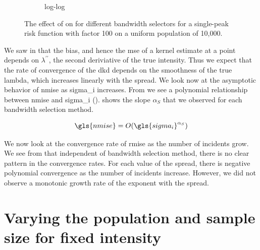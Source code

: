 \begin{figure}[htbp]
\begin{subfigure}[t]{0.49\textwidth}
        \caption{ log-log}
        \label{fig:ise:unif_Spreads_1h:nmise_log_log}
    \end{subfigure}
    \caption[: by risk ]
        {The effect of  on  for different bandwidth selectors for a single-peak risk function with \gls{factor} 100 on a uniform population of 10,000. \errorplotcaption}
    \label{fig:ise:unif_Spreads_1h}
\end{figure}

We saw in  that the bias, and hence the \gls{mse} of a kernel estimate at a point depends on $\lambda^{\prime \prime}$, the second deriviative of the true intensity.
Thus we expect that the rate of convergence of the \gls{dkd} depends on the smoothness of the true \gls{lambda},
which increases linearly with the \gls{spread}.
We look now at the asymptotic behavior of \gls{nmise} as \gls{sigma_i} increases.
From  we see a polynomial relationship between \gls{nmise} and \gls{sigma_i} ().
 shows the slope $\alpha_S$ that we observed for each bandwidth selection method.

\begin{equation}
    \label{eq:nmise:spread}
    \gls{nmise} = O(\gls{sigma_i}^{\alpha_S})
\end{equation}


We now look at the convergence rate of \gls{rmise} as the number of incidents grow.
We see from  that independent of bandwidth selection method,
there is no clear pattern in the convergence rates.
For each value of the \gls{spread}, there is negative polynomial convergence as the number of incidents increase.
However, we did not observe a monotonic growth rate of the exponent with the spread.




\section{Varying the population and sample size for fixed intensity}
\label{sec:results:unifNpop_1h}

